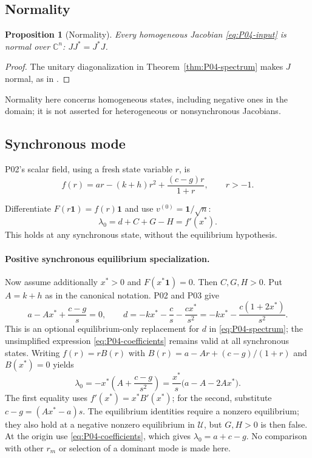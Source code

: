 \documentclass[11pt]{article}
\let\OriginalCite\cite
\renewcommand{\cite}[2][]{%
  \textcolor{CitationRed}{%
    \if\relax\detokenize{#1}\relax
      \OriginalCite{#2}%
    \else
      \OriginalCite[#1]{#2}%
    \fi}}
\newcommand{\C}{\mathbb{C}}
\newcommand{\one}{\mathbf{1}}
\newcommand{\Domain}{\mathcal{U}}
\newtheorem{proposition}[theorem]{Proposition}
\theoremstyle{definition}
\theoremstyle{remark}
\begin{document}
\subsection{Normality}
\label{slot:P04-2}

\begin{proposition}[Normality]
\label{prop:P04-normality}
Every homogeneous Jacobian \eqref{eq:P04-input} is normal over
$\C^n$: $JJ^*=J^*J$.
\end{proposition}
\begin{proof}
The unitary diagonalization in Theorem~\ref{thm:P04-spectrum}
makes $J$ normal, as in \cite[\S3.1]{Gray2006}.
\end{proof}

Normality here concerns homogeneous states, including negative ones in the domain; it is not asserted for heterogeneous or nonsynchronous Jacobians.

\subsection{Synchronous mode}

P02's scalar field, using a fresh state variable $r$, is
\[
 f(r)=ar-(k+h)r^2+\frac{(c-g)r}{1+r},\qquad r>-1.
\]

Differentiate $F(r\one)=f(r)\one$ and use $v^{(0)}=\one/\sqrt n$:
\begin{equation}
 \boxed{\lambda_0=d+C+G-H=f'(x^*).}
 \label{eq:P04-synchronous-derivative}
\end{equation}
This holds at any synchronous state, without the equilibrium hypothesis.

\paragraph{Positive synchronous equilibrium specialization.}
Now assume additionally $x^*>0$ and $F(x^*\one)=0$.
Then $C,G,H>0$. Put $A=k+h$ as in the canonical notation.
P02 and P03 give
\[
 a-Ax^*+\frac{c-g}{s}=0,\qquad
 d=-kx^*-\frac{c}{s}-\frac{cx^*}{s^2}
   =-kx^*-\frac{c(1+2x^*)}{s^2}.
\]
This is an optional equilibrium-only replacement for $d$ in
\eqref{eq:P04-spectrum}; the unsimplified expression
\eqref{eq:P04-coefficients} remains valid at all synchronous states.
Writing $f(r)=rB(r)$ with
$B(r)=a-Ar+(c-g)/(1+r)$ and $B(x^*)=0$ yields
\begin{equation}
 \boxed{\lambda_0=-x^*\left(A+\frac{c-g}{s^2}\right)
          =\frac{x^*}{s}\bigl(a-A-2Ax^*\bigr).}
 \label{eq:P04-equilibrium-zero-mode}
\end{equation}
The first equality uses $f'(x^*)=x^*B'(x^*)$; for the second,
substitute $c-g=(Ax^*-a)s$.
The equilibrium identities require a nonzero equilibrium; they also
hold at a negative nonzero equilibrium in $\Domain$, but $G,H>0$
is then false. At the origin use \eqref{eq:P04-coefficients}, which
gives $\lambda_0=a+c-g$. No comparison with other $r_m$ or selection
of a dominant mode is made here.
\end{document}
